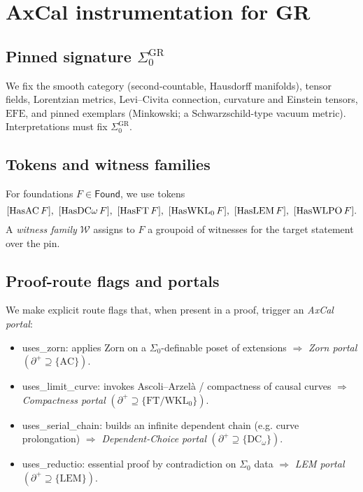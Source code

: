 \documentclass[11pt]{article}
\theoremstyle{definition}
\theoremstyle{remark}
\newcommand{\LEM}{\mathrm{LEM}}
\newcommand{\FT}{\mathrm{FT}}
\newcommand{\WKLz}{\mathrm{WKL}_0}
\newcommand{\AC}{\mathrm{AC}}
\newcommand{\DCw}{\mathrm{DC}_\omega}
\newcommand{\Found}{\mathsf{Found}}
\newcommand{\SigmaZero}{\Sigma_{0}}
\newcommand{\Frontierpos}{\partial^{+}}
\newcommand{\EFE}{\mathrm{EFE}} %
\begin{document}
\tableofcontents

\section{AxCal instrumentation for GR}
\subsection{Pinned signature \texorpdfstring{$\SigmaZero^{\mathrm{GR}}$}{Σ0$^{\mathrm{GR}}$}}
We fix the smooth category (second-countable, Hausdorff manifolds), tensor fields, Lorentzian metrics, Levi--Civita connection, curvature and Einstein tensors, $\EFE$, and pinned exemplars (Minkowski; a Schwarzschild-type vacuum metric). Interpretations must fix $\SigmaZero^{\mathrm{GR}}$.

\subsection{Tokens and witness families}
For foundations $F\in\Found$, we use tokens
\[
[{\rm HasAC}\,F],\ [{\rm HasDC}\omega\,F],\ [{\rm HasFT}\,F],\ [{\rm HasWKL}_0\,F],\ [{\rm HasLEM}\,F],\ [{\rm HasWLPO}\,F].
\]
A \emph{witness family} $\mathcal{W}$ assigns to $F$ a groupoid of witnesses for the target statement over the pin.

\subsection{Proof-route flags and portals}
We make explicit route flags that, when present in a proof, trigger an \emph{AxCal portal}:
\begin{itemize}
\item \textsf{uses\_zorn}: applies Zorn on a $\SigmaZero$-definable poset of extensions $\Rightarrow$ \emph{Zorn portal} $(\Frontierpos\supseteq\{\AC\})$.
\item \textsf{uses\_limit\_curve}: invokes Ascoli--Arzelà / compactness of causal curves $\Rightarrow$ \emph{Compactness portal} $(\Frontierpos\supseteq\{\FT/\WKLz\})$.
\item \textsf{uses\_serial\_chain}: builds an infinite dependent chain (e.g. curve prolongation) $\Rightarrow$ \emph{Dependent-Choice portal} $(\Frontierpos\supseteq\{\DCw\})$.
\item \textsf{uses\_reductio}: essential proof by contradiction on $\SigmaZero$ data $\Rightarrow$ \emph{LEM portal} $(\Frontierpos\supseteq\{\LEM\})$.
\end{itemize}
\end{document}
